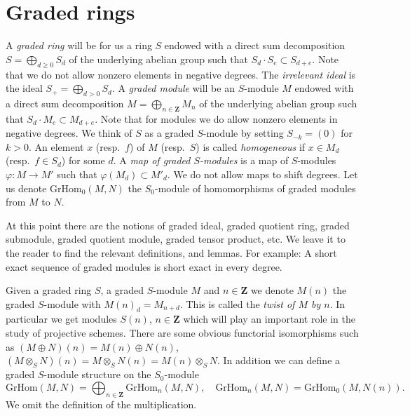 \section{Graded rings}
\label{section-graded}

\noindent
A {\it graded ring} will be for us a ring $S$ endowed
with a direct sum decomposition $S = \bigoplus_{d \geq 0} S_d$
of the underlying abelian group such that $S_d \cdot S_e \subset S_{d + e}$.
Note that we do not allow nonzero elements in negative degrees.
The {\it irrelevant ideal} is the ideal $S_{+} = \bigoplus_{d > 0} S_d$.
A {\it graded module}
will be an $S$-module $M$ endowed with a direct sum decomposition
$M = \bigoplus_{n\in \mathbf{Z}} M_n$ of the underlying abelian group
such that $S_d \cdot M_e \subset M_{d + e}$. Note that for modules we do allow
nonzero elements in negative degrees.
We think of $S$ as a graded $S$-module by setting $S_{-k} = (0)$
for $k > 0$. An element $x$ (resp.\ $f$) of $M$ (resp.\ $S$) is called
{\it homogeneous}
if $x \in M_d$ (resp.\ $f \in S_d$) for some $d$.
A {\it map of graded $S$-modules} is a map of $S$-modules
$\varphi : M \to M'$ such that $\varphi(M_d) \subset M'_d$.
We do not allow maps to shift degrees. Let us denote
$\text{GrHom}_0(M, N)$ the $S_0$-module of homomorphisms
of graded modules from $M$ to $N$.

\medskip\noindent
At this point there are the notions of graded ideal,
graded quotient ring, graded submodule, graded quotient module,
graded tensor product, etc. We leave it to the reader to find the
relevant definitions, and lemmas. For example: A short exact sequence
of graded modules is short exact in every degree.

\medskip\noindent
Given a graded ring $S$, a graded $S$-module $M$ and $n \in \mathbf{Z}$
we denote $M(n)$ the graded $S$-module with $M(n)_d = M_{n + d}$.
This is called the {\it twist of $M$ by $n$}. In particular we get
modules $S(n)$, $n \in \mathbf{Z}$ which will play an important
role in the study of projective schemes. There are some obvious
functorial isomorphisms such as
$(M \oplus N)(n) = M(n) \oplus N(n)$,
$(M \otimes_S N)(n) = M \otimes_S N(n) = M(n) \otimes_S N$.
In addition we can define a graded $S$-module structure on
the $S_0$-module
$$
\text{GrHom}(M, N) =
\bigoplus\nolimits_{n \in \mathbf{Z}} \text{GrHom}_n(M, N),
\quad
\text{GrHom}_n(M, N) = \text{GrHom}_0(M, N(n)).
$$
We omit the definition of the multiplication.

